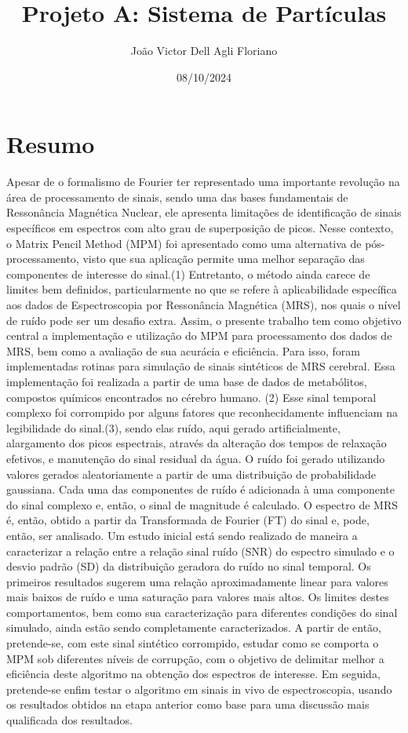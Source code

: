 \documentclass{article}
\title{Projeto A: Sistema de Partículas}
\author{João Victor Dell Agli Floriano}
\date{08/10/2024}
\begin{document}
\maketitle

\section{Resumo}

Apesar de o formalismo de Fourier ter representado uma importante revolução na área de processamento de sinais, 
sendo uma das bases fundamentais de Ressonância Magnética Nuclear, ele apresenta limitações de identificação de 
sinais específicos em espectros com alto grau de superposição de picos. Nesse contexto, o Matrix Pencil Method (MPM) 
foi apresentado como uma alternativa de pós-processamento, visto que sua aplicação permite uma melhor separação das 
componentes de interesse do sinal.(1) Entretanto, o método ainda carece de limites bem definidos, particularmente no 
que se refere à aplicabilidade específica aos dados de Espectroscopia por Ressonância Magnética (MRS), nos quais o 
nível de ruído pode ser um desafio extra. Assim, o presente trabalho tem como objetivo central a implementação e 
utilização do MPM para processamento dos dados de MRS, bem como a avaliação de sua acurácia e eficiência. Para isso, 
foram implementadas rotinas para simulação de sinais sintéticos de MRS cerebral. Essa implementação foi realizada 
a partir de uma base de dados de metabólitos, compostos químicos encontrados no cérebro humano. (2) Esse sinal temporal 
complexo foi corrompido por alguns fatores que reconhecidamente influenciam na legibilidade do sinal.(3), sendo elas ruído, 
aqui gerado artificialmente, alargamento dos picos espectrais, através da alteração dos tempos de relaxação efetivos, 
e manutenção do sinal residual da água. O ruído foi gerado utilizando valores gerados aleatoriamente a partir de uma 
distribuição de probabilidade gaussiana. Cada uma das componentes de ruído é adicionada à uma componente do sinal complexo e, 
então, o sinal de magnitude é calculado. O espectro de MRS é, então, obtido a partir da Transformada de Fourier (FT) do 
sinal e, pode, então, ser analisado. Um estudo inicial está sendo realizado de maneira a caracterizar a relação entre a 
relação sinal ruído (SNR) do espectro simulado e o desvio padrão (SD) da distribuição geradora do ruído no sinal temporal. 
Os primeiros resultados sugerem uma relação aproximadamente linear para valores mais baixos de ruído e uma saturação 
para valores mais altos. Os limites destes comportamentos, bem como sua caracterização para diferentes condições do sinal 
simulado, ainda estão sendo completamente caracterizados. A partir de então, pretende-se, com este sinal sintético corrompido, 
estudar como se comporta o MPM sob diferentes níveis de corrupção, com o objetivo de delimitar melhor a eficiência 
deste algoritmo na obtenção dos espectros de interesse. Em seguida, pretende-se enfim testar o algoritmo em sinais in vivo 
de espectroscopia, usando os resultados obtidos na etapa anterior como base para uma discussão mais qualificada dos resultados.
\end{document}
